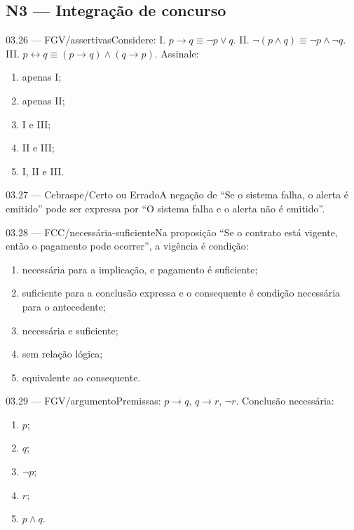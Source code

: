 \subsection*{N3 — Integração de concurso}
\begin{questao}{ 03.26 — FGV/assertivas}Considere: I. $p\to q\equiv\neg p\lor q$. II. $\neg(p\land q)\equiv\neg p\land\neg q$. III. $p\leftrightarrow q\equiv(p\to q)\land(q\to p)$. Assinale:\begin{enumerate}[label=\Alph*)]\item apenas I;\item apenas II;\item I e III;\item II e III;\item I, II e III.\end{enumerate}\end{questao}
\begin{questao}{ 03.27 — Cebraspe/Certo ou Errado}A negação de ``Se o sistema falha, o alerta é emitido'' pode ser expressa por ``O sistema falha e o alerta não é emitido''.\end{questao}
\begin{questao}{ 03.28 — FCC/necessária-suficiente}Na proposição ``Se o contrato está vigente, então o pagamento pode ocorrer'', a vigência é condição:\begin{enumerate}[label=\Alph*)]\item necessária para a implicação, e pagamento é suficiente;\item suficiente para a conclusão expressa e o consequente é condição necessária para o antecedente;\item necessária e suficiente;\item sem relação lógica;\item equivalente ao consequente.\end{enumerate}\end{questao}
\begin{questao}{ 03.29 — FGV/argumento}Premissas: $p\to q$, $q\to r$, $\neg r$. Conclusão necessária:\begin{enumerate}[label=\Alph*)]\item $p$;\item $q$;\item $\neg p$;\item $r$;\item $p\land q$.\end{enumerate}\end{questao}
